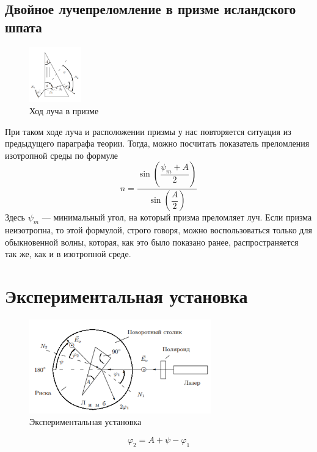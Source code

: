 \subsection{Двойное лучепреломление в призме исландского шпата}
\begin{figure}
  \begin{center}
    \includegraphics[width = 0.2\textwidth]{1.png}
  \end{center}
  \caption{Ход луча в призме}
\end{figure}
При таком ходе луча и расположении призмы у нас повторяется ситуация из предыдущего параграфа теории. Тогда, можно посчитать показатель преломления изотропной среды по формуле 
\begin{equation}
n = \dfrac{\sin\left(\dfrac{\psi_m + A}{2}\right)}{\sin \left(\dfrac{A}{2}\right)}
\end{equation}
Здесь $\psi_m$  --- минимальный угол, на который призма преломляет луч.
Если призма неизотропна, то этой формулой, строго говоря, можно воспользоваться только для обыкновенной волны, которая, как это было показано ранее, распространяется так же, как и в изотропной среде. 
\section{Экспериментальная установка}

\begin{figure}[h]
\begin{center}
\includegraphics[width = 0.7\textwidth]{2.png}
\caption{Экспериментальная установка}
\end{center}
\end{figure}
\begin{equation}
\varphi_2 = A + \psi - \varphi_1
\end{equation}

